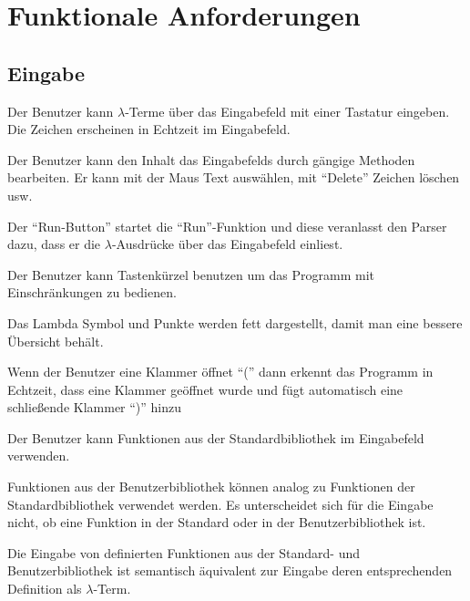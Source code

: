 \documentclass[parskip=full,11pt,twoside]{scrartcl}
\begin{document}
\section{Funktionale Anforderungen}

\subsection{Eingabe}
Der Benutzer kann $\lambda$-Terme über das Eingabefeld mit einer Tastatur eingeben. Die Zeichen erscheinen in Echtzeit im Eingabefeld.

Der Benutzer kann den Inhalt das Eingabefelds durch gängige Methoden bearbeiten.
Er kann mit der Maus Text auswählen, mit \enquote{Delete} Zeichen löschen usw.

Der \enquote{Run-Button} startet die  \enquote{Run}-Funktion und diese veranlasst den Parser dazu, dass er die $\lambda$-Ausdrücke über das Eingabefeld einliest.

Der Benutzer kann Tastenkürzel benutzen um das Programm mit Einschränkungen zu bedienen. 

Das Lambda Symbol und Punkte werden fett dargestellt, damit man eine bessere Übersicht behält.

Wenn der Benutzer eine Klammer öffnet \enquote{(} dann erkennt das Programm in Echtzeit, dass eine Klammer geöffnet wurde und fügt automatisch eine schließende Klammer \enquote{)} hinzu

Der Benutzer kann Funktionen aus der Standardbibliothek im Eingabefeld verwenden.

Funktionen aus der Benutzerbibliothek können analog zu Funktionen der Standardbibliothek verwendet werden. Es unterscheidet sich für die Eingabe nicht, ob eine Funktion in der Standard oder in der Benutzerbibliothek ist.


Die Eingabe von definierten Funktionen aus der Standard- und Benutzerbibliothek ist semantisch äquivalent zur Eingabe deren entsprechenden Definition als $\lambda$-Term.
\end{document}
